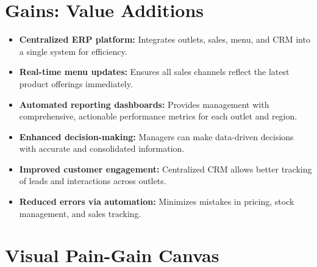 \section*{Gains: Value Additions}

\begin{itemize}
    \item \textbf{Centralized ERP platform:} Integrates outlets, sales, menu, and CRM into a single system for efficiency.
    \item \textbf{Real-time menu updates:} Ensures all sales channels reflect the latest product offerings immediately.
    \item \textbf{Automated reporting dashboards:} Provides management with comprehensive, actionable performance metrics for each outlet and region.
    \item \textbf{Enhanced decision-making:} Managers can make data-driven decisions with accurate and consolidated information.
    \item \textbf{Improved customer engagement:} Centralized CRM allows better tracking of leads and interactions across outlets.
    \item \textbf{Reduced errors via automation:} Minimizes mistakes in pricing, stock management, and sales tracking.
\end{itemize}

\section*{Visual Pain-Gain Canvas}

